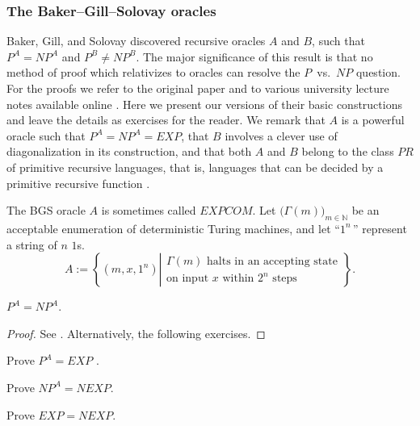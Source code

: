 \documentclass[letterpaper]{article}
\begin{document}
\subsubsection{The Baker--Gill--Solovay oracles}\label{bgs}
Baker, Gill, and Solovay discovered recursive oracles $A$ and $B$, such that $P^A=NP^A$ and $P^B\ne NP^B$.  The major significance of this result is that no method of proof which relativizes to oracles can resolve the $P$~vs.~$NP$ question.  For the proofs we refer to the original paper \cite{baker1975relativizations} and to various university lecture notes available online \cite{spielman2001adv, feigenbaum2010bgs,holenstein2010complex,moshkovitz2012rel}.  Here we present our versions of their basic constructions and leave the details as exercises for the reader.  We remark that $A$ is a powerful oracle such that $P^A=NP^A=EXP$, that $B$ involves a clever use of diagonalization in its construction, and that both $A$ and $B$ belong to the class $PR$ of primitive recursive languages, that is, languages that can be decided by a primitive recursive function \cite{robinson1950general}.
\begin{definition}\label{bgsa}
The BGS oracle $A$ is sometimes called $EXPCOM$. Let $\big(\Gamma(m)\big)_{m\in\mathbb N}$ be an acceptable enumeration of deterministic Turing machines, and let ``$1^n\,$'' represent a string of $n$ $1$s.
\begin{equation}
A:=\left\{(m,x,1^n)\left|\begin{array}{l}
\Gamma(m) \textrm{ halts in an accepting state} \\ \textrm{on input } x \textrm{ within } 2^n \textrm{ steps}
\end{array}\right.\right\}.
\end{equation}
\end{definition}
\begin{theorem}
	$P^A=NP^A$.
\end{theorem}
\begin{proof}
See \cite{baker1975relativizations,spielman2001adv, feigenbaum2010bgs,holenstein2010complex,moshkovitz2012rel}.  Alternatively, the following exercises.
\end{proof}

\begin{exercise}
	Prove $P^A=EXP$ \cite{volleyball-icon}.
\end{exercise}
\begin{exercise}
Prove $NP^A=NEXP$.
\end{exercise}
\begin{exercise}
Prove $EXP=NEXP$.
\end{exercise}
\end{document}
